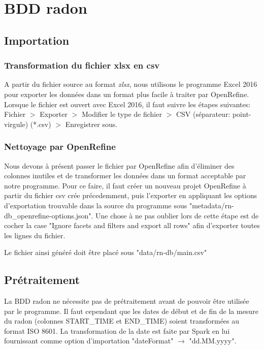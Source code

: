 \section{BDD radon}

\subsection{Importation}

\subsubsection{Transformation du fichier xlsx en csv}
A partir du fichier source au format \textit{xlsx}, nous utilisons le programme Excel 2016 pour exporter les données dans un format plus facile à traiter par OpenRefine. Lorsque le fichier est ouvert avec Excel 2016, il faut suivre les étapes suivantes: Fichier $>$ Exporter $>$ Modifier le type de fichier $>$ CSV (séparateur: point-virgule) (*.csv) $>$ Enregistrer sous.

\subsubsection{Nettoyage par OpenRefine}
Nous devons à présent passer le fichier par OpenRefine afin d'éliminer des colonnes inutiles et de transformer les données dans un format acceptable par notre programme. Pour ce faire, il faut créer un nouveau projet OpenRefine à partir du fichier csv crée précedemment, puis l'exporter en appliquant les options d'exportation trouvable dans la source du programme sous "metadata/rn-db\_openrefine-options.json". Une chose à ne pas oublier lors de cette étape est de cocher la case "Ignore facets and filters and export all rows" afin d'exporter toutes les lignes du fichier.

Le fichier ainsi généré doit être placé sous "data/rn-db/main.csv"

\subsection{Prétraitement}

La BDD radon ne nécessite pas de prétraitement avant de pouvoir être utilisée par le programme. Il faut cependant que les dates de début et de fin de la mesure du radon (colonnes START\_TIME et END\_TIME) soient transformées au format ISO 8601. La transformation de la date est faite par Spark en lui fournissant comme option d'importation "dateFormat" $\rightarrow$ "dd.MM.yyyy". 

